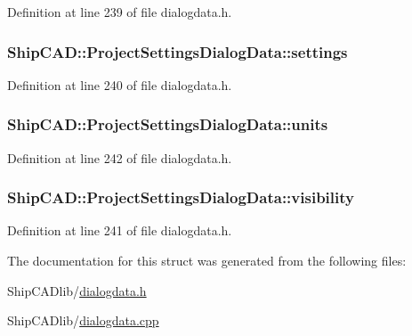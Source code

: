Definition at line 239 of file dialogdata.\+h.

\subsubsection[{\texorpdfstring{settings}{settings}}]{ Ship\+C\+A\+D\+::\+Project\+Settings\+Dialog\+Data\+::settings}\hypertarget{structShipCAD_1_1ProjectSettingsDialogData_ae6f280accdfe3f4d212a5f1eec023c16}{}\label{structShipCAD_1_1ProjectSettingsDialogData_ae6f280accdfe3f4d212a5f1eec023c16}


Definition at line 240 of file dialogdata.\+h.

\subsubsection[{\texorpdfstring{units}{units}}]{ Ship\+C\+A\+D\+::\+Project\+Settings\+Dialog\+Data\+::units}\hypertarget{structShipCAD_1_1ProjectSettingsDialogData_a0c5b5a3e4f840c501ba4e19191050284}{}\label{structShipCAD_1_1ProjectSettingsDialogData_a0c5b5a3e4f840c501ba4e19191050284}


Definition at line 242 of file dialogdata.\+h.

\subsubsection[{\texorpdfstring{visibility}{visibility}}]{ Ship\+C\+A\+D\+::\+Project\+Settings\+Dialog\+Data\+::visibility}\hypertarget{structShipCAD_1_1ProjectSettingsDialogData_a97f37da0a44aaca11963ab6a3d7da218}{}\label{structShipCAD_1_1ProjectSettingsDialogData_a97f37da0a44aaca11963ab6a3d7da218}


Definition at line 241 of file dialogdata.\+h.



The documentation for this struct was generated from the following files\+:\begin{DoxyCompactItemize}
\item 
Ship\+C\+A\+Dlib/\hyperlink{dialogdata_8h}{dialogdata.\+h}\item 
Ship\+C\+A\+Dlib/\hyperlink{dialogdata_8cpp}{dialogdata.\+cpp}\end{DoxyCompactItemize}
